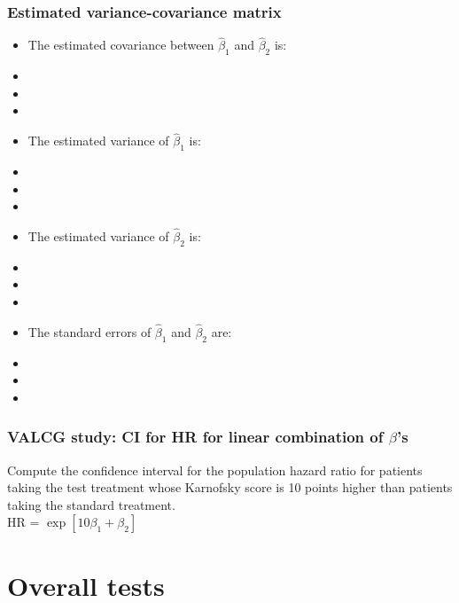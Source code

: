 \begin{frame}
\frametitle{Estimated variance-covariance matrix}
\begin{itemize}
\item The estimated covariance between $\hat{\beta}_1$ and $\hat{\beta}_2$ is:
\item[]
\item[]
\item[]
\item The estimated variance of $\hat{\beta}_1$ is:
\item[]
\item[]
\item[]
\item The estimated variance of $\hat{\beta}_2$ is:
\item[]
\item[]
\item[]
\item The standard errors of $\hat{\beta}_1$ and $\hat{\beta}_2$ are:
\item[]
\item[]
\item[]
\end{itemize}
\end{frame}

\begin{frame}
\frametitle{VALCG study: CI for HR for linear combination of $\beta$'s}
Compute the confidence interval for the population hazard ratio for patients taking the test treatment whose Karnofsky score is 10 points higher than patients taking the standard treatment. \\HR = $\exp[10\beta_1+\beta_2]$
\vskip200pt
\end{frame}


\section[Overall tests]{Overall tests}
\subsection{}
\begin{frame}
\end{frame}


